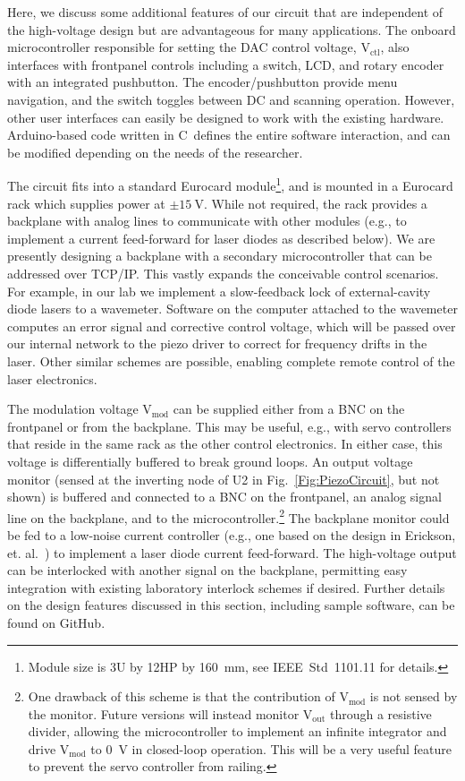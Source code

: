 \documentclass[aip,rsi,reprint]{revtex4-1} %
\newcommand{\CC}{{C\nolinebreak[4]\hspace{-.05em}\raisebox{.4ex}{\tiny\bf ++}}~}
\begin{document}
Here, we discuss some additional features of our circuit that are independent of the high-voltage design but are advantageous for many applications.
The onboard microcontroller responsible for setting the DAC control voltage, $\text{V}_\text{ctl}$, also interfaces with frontpanel controls including a switch, LCD, and rotary encoder with an integrated pushbutton.
The encoder/pushbutton provide menu navigation, and the switch toggles between DC and scanning operation.
However, other user interfaces can easily be designed to work with the existing hardware.
Arduino-based code\cite{Arduino} written in \CC defines the entire software interaction, and can be modified depending on the needs of the researcher.

The circuit fits into a standard Eurocard module\footnote{Module size is 3U by 12HP by \SI{160}{\milli\meter}, see IEEE~Std~1101.11 for details.}, and is mounted in a Eurocard rack which supplies power at $\pm\SI{15}{\volt}$.
While not required, the rack provides a backplane with analog lines to communicate with other modules (e.g., to implement a current feed-forward for laser diodes as described below).
We are presently designing a backplane with a secondary microcontroller that can be addressed over TCP/IP.
This vastly expands the conceivable control scenarios. 
For example, in our lab we implement a slow-feedback lock of external-cavity diode lasers to a wavemeter.
Software on the computer attached to the wavemeter computes an error signal and corrective control voltage, which will be passed over our internal network to the piezo driver to correct for frequency drifts in the laser.
Other similar schemes are possible, enabling complete remote control of the laser electronics.

The modulation voltage $\text{V}_\text{mod}$ can be supplied either from a BNC on the frontpanel or from the backplane.
This may be useful, e.g., with servo controllers that reside in the same rack as the other control electronics.
In either case, this voltage is differentially buffered to break ground loops.
An output voltage monitor (sensed at the inverting node of U2 in Fig.~\ref{Fig:PiezoCircuit}, but not shown) is buffered and connected to a BNC on the frontpanel, an analog signal line on the backplane, and to the microcontroller.\footnote{One drawback of this scheme is that the contribution of $\text{V}_\text{mod}$ is not sensed by the monitor. Future versions will instead monitor $\text{V}_\text{out}$ through a resistive divider, allowing the microcontroller to implement an infinite integrator and drive $\text{V}_\text{mod}$ to \SI{0}{\volt} in closed-loop operation. This will be a very useful feature to prevent the servo controller from railing.}
The backplane monitor could be fed to a low-noise current controller (e.g., one based on the design in Erickson, et. al.~\cite{Erickson2008a}) to implement a laser diode current feed-forward.
The high-voltage output can be interlocked with another signal on the backplane, permitting easy integration with existing laboratory interlock schemes if desired.
Further details on the design features discussed in this section, including sample software, can be found on GitHub.\cite{PiezoDesignFiles}
\end{document}
